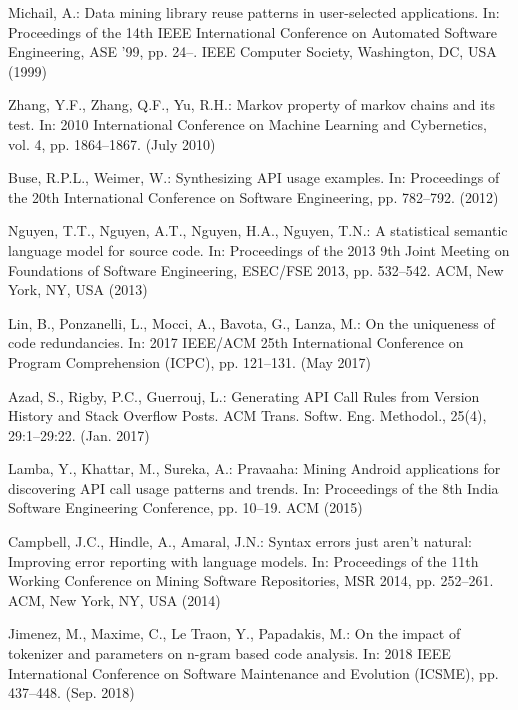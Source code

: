 \documentclass[runningheads]{llncs}
\begin{document}
\begin{thebibliography}{8}
    Michail, A.: Data mining library reuse patterns in user-selected applications. In: Proceedings of the 14th IEEE International Conference on Automated Software Engineering, ASE ’99, pp. 24--. IEEE Computer Society, Washington, DC, USA (1999)
    
    Zhang, Y.F., Zhang, Q.F., Yu, R.H.: Markov property of markov chains and its test. In: 2010 International Conference on Machine Learning and Cybernetics, vol. 4, pp. 1864--1867. (July 2010)
    
    Buse, R.P.L., Weimer, W.: Synthesizing API usage examples. In: Proceedings of the 20th International Conference on Software Engineering, pp. 782--792. (2012)
    
    Nguyen, T.T., Nguyen, A.T., Nguyen, H.A., Nguyen, T.N.: A statistical semantic language model for source code. In: Proceedings of the 2013 9th Joint Meeting on Foundations of Software Engineering, ESEC/FSE 2013, pp. 532--542. ACM, New York, NY, USA (2013)
    
    Lin, B., Ponzanelli, L., Mocci, A., Bavota, G., Lanza, M.: On the uniqueness of code redundancies. In: 2017 IEEE/ACM 25th International Conference on Program Comprehension (ICPC), pp. 121--131. (May 2017)
    
    Azad, S., Rigby, P.C., Guerrouj, L.: Generating API Call Rules from Version History and Stack Overflow Posts. ACM Trans. Softw. Eng. Methodol., 25(4), 29:1--29:22. (Jan. 2017)
    
    Lamba, Y., Khattar, M., Sureka, A.: Pravaaha: Mining Android applications for discovering API call usage patterns and trends. In: Proceedings of the 8th India Software Engineering Conference, pp. 10--19. ACM (2015)
    
    Campbell, J.C., Hindle, A., Amaral, J.N.: Syntax errors just aren’t natural: Improving error reporting with language models. In: Proceedings of the 11th Working Conference on Mining Software Repositories, MSR 2014, pp. 252--261. ACM, New York, NY, USA (2014)
    
    Jimenez, M., Maxime, C., Le Traon, Y., Papadakis, M.: On the impact of tokenizer and parameters on n-gram based code analysis. In: 2018 IEEE International Conference on Software Maintenance and Evolution (ICSME), pp. 437--448. (Sep. 2018)
    

\end{thebibliography}
\end{document}
